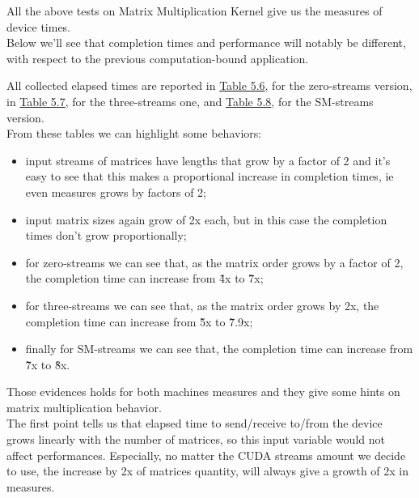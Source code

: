 All the above tests on Matrix Multiplication Kernel give us the measures of device times.\\
Below we'll see that completion times and performance will notably be different, with respect to the previous computation-bound application.

All collected elapsed times are reported in \hyperref[tab:matvgszero]{Table 5.6}, for the zero-streams version, in \hyperref[tab:matvgsThree]{Table 5.7}, for the three-streams one, and \hyperref[tab:matvgsSM]{Table 5.8}, for the SM-streams version.\\
From these tables we can highlight some behaviors:
\begin{itemize}
	\item input streams of matrices have lengths that grow by a factor of 2 and it's easy to see that this makes a proportional increase in completion times, ie even measures grows by factors of 2;
	
	\item input matrix sizes again grow of 2x each, but in this case the completion times don't grow proportionally;
	
	\item for zero-streams we can see that, as the matrix order grows by a factor of 2, the completion time can increase from \~4x to \~7x; 
	
	\item for three-streams we can see that, as the matrix order grows by 2x, the completion time can increase from \~5x to \~7.9x; 
	
	\item finally for SM-streams we can see that, the completion time can increase from \~7x to \~8x.
\end{itemize}
Those evidences holds for both machines measures and they give some hints on matrix multiplication behavior.\\
The first point tells us that elapsed time to send/receive to/from the device grows linearly with the number of matrices, so this input variable would not affect performances. Especially, no matter the CUDA streams amount we decide to use, the increase by 2x of matrices quantity, will always give a growth of 2x in measures.

